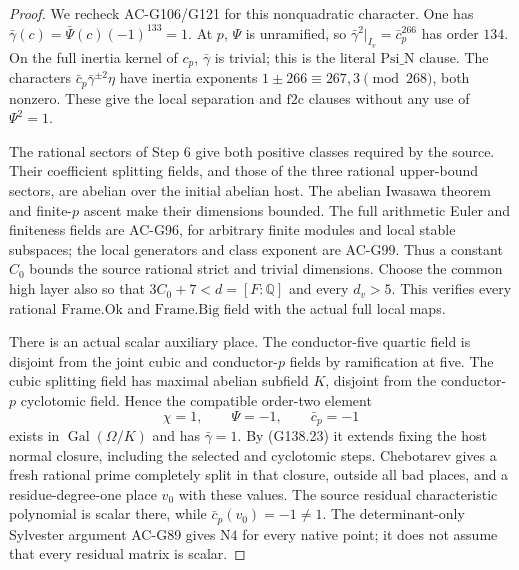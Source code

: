 \begin{proof}
We recheck AC-G106/G121 for this nonquadratic character.
One has \(\bar\gamma(c)=\bar\Psi(c)(-1)^{133}=1\).
At \(p\), \(\Psi\) is unramified, so
\(\bar\gamma^2|_{I_v}=\bar c_p^{266}\) has order \(134\).
On the full inertia kernel of \(c_p\), \(\bar\gamma\)
is trivial; this is the literal \(\mathrm{Psi\_N}\) clause.
The characters \(\bar c_p\bar\gamma^{\pm2}\eta\) have
inertia exponents \(1\pm266\equiv267,3\pmod{268}\), both
nonzero.  These give the local separation and \(\mathrm{f2c}\)
clauses without any use of \(\Psi^2=1\).

The rational sectors of Step 6 give both positive classes
required by the source.  Their coefficient splitting fields,
and those of the three rational upper-bound sectors, are
abelian over the initial abelian host.  The abelian Iwasawa
theorem and finite-\(p\) ascent make their dimensions bounded.
The full arithmetic Euler and finiteness fields are AC-G96,
for arbitrary finite modules and local stable subspaces;
the local generators and class exponent are AC-G99.
Thus a constant \(C_0\) bounds the source rational strict
and trivial dimensions.  Choose the common high layer also
so that \(3C_0+7<d=[F:\mathbb Q]\) and every \(d_v>5\).
This verifies every rational \(\mathrm{Frame.Ok}\) and
\(\mathrm{Frame.Big}\) field with the actual full local maps.

There is an actual scalar auxiliary place.  The conductor-five
quartic field is disjoint from the joint cubic and conductor-\(p\)
fields by ramification at five.  The cubic splitting field has
maximal abelian subfield \(K\), disjoint from the conductor-\(p\)
cyclotomic field.  Hence the compatible order-two element
\[
                 \chi=1,\qquad\Psi=-1,\qquad\bar c_p=-1
 \tag{G138.27}
\]
exists in \(\operatorname{Gal}(\Omega/K)\) and has
\(\bar\gamma=1\).  By (G138.23) it extends fixing the host
normal closure, including the selected and cyclotomic steps.
Chebotarev gives a fresh rational prime completely split in
that closure, outside all bad places, and a residue-degree-one
place \(v_0\) with these values.  The source residual
characteristic polynomial is scalar there, while
\(\bar c_p(v_0)=-1\ne1\).  The determinant-only Sylvester
argument AC-G89 gives \(\mathrm{N4}\) for every native point;
it does not assume that every residual matrix is scalar.


\end{proof}
